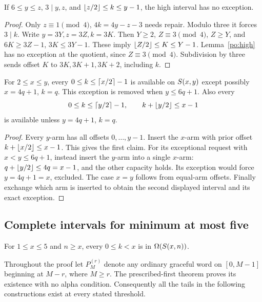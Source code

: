 \begin{lemma}\label{po:three-repair}
If $6\le y\le z$, $3\mid y,z$, and $\left\lfloor z/2\right\rfloor\le k\le y-1$, the high interval has no exception.
\end{lemma}
\begin{proof}
Only $z\equiv1\pmod4$, $4k=4y-z-3$ needs repair. Modulo three it forces $3\mid k$. Write $y=3Y,z=3Z,k=3K$. Then $Y\ge2$, $Z\equiv3\pmod4$, $Z\ge Y$, and
$6K\ge3Z-1$, $3K\le3Y-1$. These imply $\left\lfloor Z/2\right\rfloor\le K\le Y-1$. Lemma~\ref{po:high} has no exception at the quotient, since $Z\equiv3\pmod4$. Subdivision by three sends offset $K$ to $3K,3K+1,3K+2$, including $k$.
\end{proof}

\begin{lemma}\label{po:low}
For $2\le x\le y$, every $0\le k\le\left\lceil x/2\right\rceil-1$ is available on $S\!\left(x,y\right)$ except possibly $x=4q+1$, $k=q$. This exception is removed when $y\le6q+1$. Also every
\[
0\le k\le\left\lceil y/2\right\rceil-1,\qquad k+\left\lfloor y/2\right\rfloor\le x-1
\]
is available unless $y=4q+1$, $k=q$.
\end{lemma}
\begin{proof}
Every $y$-arm has all offsets $0,\ldots,y-1$. Insert the $x$-arm with prior offset $k+\left\lfloor x/2\right\rfloor\le x-1$. This gives the first claim. For its exceptional request with $x<y\le6q+1$, instead insert the $y$-arm into a single $x$-arm: $q+\left\lfloor y/2\right\rfloor\le4q=x-1$, and the other capacity holds. Its exception would force $y=4q+1=x$, excluded. The case $x=y$ follows from equal-arm offsets. Finally exchange which arm is inserted to obtain the second displayed interval and its exact exception.
\end{proof}

\subsection{Complete intervals for minimum at most five}
\begin{theorem}\label{po:small}
For $1\le x\le5$ and $n\ge x$, every $0\le k<x$ is in $\Omega(S\!\left(x,n\right))$.
\end{theorem}
Throughout the proof let $P_M^{(r)}$ denote any ordinary graceful word on $[0,M-1]$ beginning at $M-r$, where $M\ge r$. The prescribed-first theorem proves its existence with no alpha condition. Consequently all the tails in the following constructions exist at every stated threshold.

